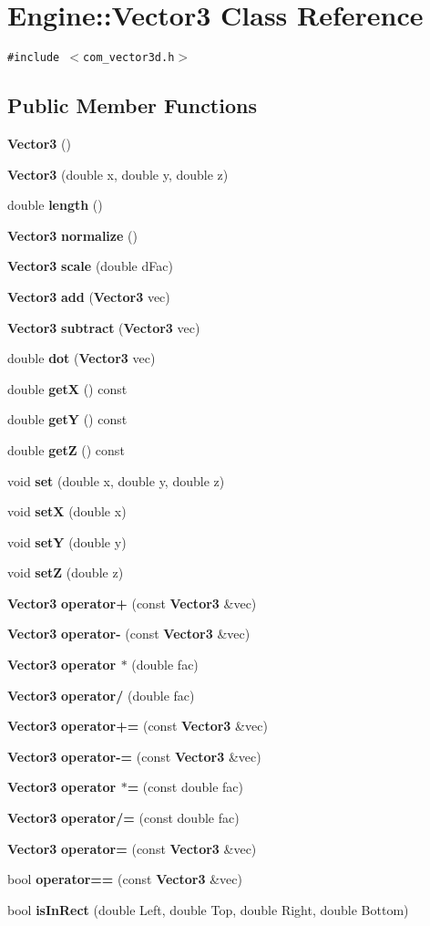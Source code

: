 \section{Engine::Vector3 Class Reference}
\label{classEngine_1_1Vector3}
{\tt \#include $<$com\_\-vector3d.h$>$}

\subsection*{Public Member Functions}
\begin{CompactItemize}
\item 
{\bf Vector3} ()
\item 
{\bf Vector3} (double x, double y, double z)
\item 
double {\bf length} ()
\item 
{\bf Vector3} {\bf normalize} ()
\item 
{\bf Vector3} {\bf scale} (double dFac)
\item 
{\bf Vector3} {\bf add} ({\bf Vector3} vec)
\item 
{\bf Vector3} {\bf subtract} ({\bf Vector3} vec)
\item 
double {\bf dot} ({\bf Vector3} vec)
\item 
double {\bf getX} () const 
\item 
double {\bf getY} () const 
\item 
double {\bf getZ} () const 
\item 
void {\bf set} (double x, double y, double z)
\item 
void {\bf setX} (double x)
\item 
void {\bf setY} (double y)
\item 
void {\bf setZ} (double z)
\item 
{\bf Vector3} {\bf operator+} (const {\bf Vector3} \&vec)
\item 
{\bf Vector3} {\bf operator-} (const {\bf Vector3} \&vec)
\item 
{\bf Vector3} {\bf operator $\ast$} (double fac)
\item 
{\bf Vector3} {\bf operator/} (double fac)
\item 
{\bf Vector3} {\bf operator+=} (const {\bf Vector3} \&vec)
\item 
{\bf Vector3} {\bf operator-=} (const {\bf Vector3} \&vec)
\item 
{\bf Vector3} {\bf operator $\ast$=} (const double fac)
\item 
{\bf Vector3} {\bf operator/=} (const double fac)
\item 
{\bf Vector3} {\bf operator=} (const {\bf Vector3} \&vec)
\item 
bool {\bf operator==} (const {\bf Vector3} \&vec)
\item 
bool {\bf isInRect} (double Left, double Top, double Right, double Bottom)
\end{CompactItemize}



